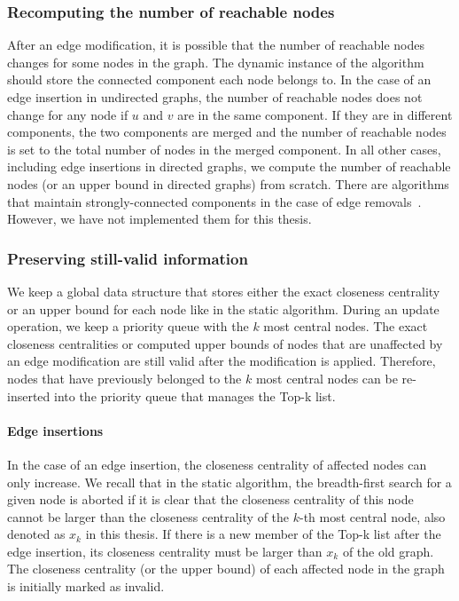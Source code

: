 \subsubsection{Recomputing the number of reachable nodes}
After an edge modification, it is possible that the number of reachable nodes changes for some nodes in the graph. The dynamic instance of the algorithm should store the connected component each node belongs to. In the case of an edge insertion in undirected graphs, the number of reachable nodes does not change for any node if $u$ and $v$ are in the same component. If they are in different components, the two components are merged and the number of reachable nodes is set to the total number of nodes in the merged component. In all other cases, including edge insertions in directed graphs, we compute the number of reachable nodes (or an upper bound in directed graphs) from scratch. There are algorithms that maintain strongly-connected components in the case of edge removals~\cite{lkacki2013improved,chechik2016decremental}. However, we have not implemented them for this thesis.

\subsubsection{Preserving still-valid information}
We keep a global data structure that stores either the exact closeness centrality or an upper bound for each node like in the static algorithm. During an update operation, we keep a priority queue with the $k$ most central nodes. The exact closeness centralities or computed upper bounds of nodes that are unaffected by an edge modification are still valid after the modification is applied. Therefore, nodes that have previously belonged to the $k$ most central nodes can be re-inserted into the priority queue that manages the Top-k list.

\paragraph{Edge insertions}
In the case of an edge insertion, the closeness centrality of affected nodes can only increase.  We recall that in the static algorithm, the breadth-first search for a given node is aborted if it is clear that the closeness centrality of this node cannot be larger than the closeness centrality of the $k$-th most central node, also denoted as $x_k$ in this thesis. If there is a new member of the Top-k list after the edge insertion, its closeness centrality must be larger than $x_k$ of the old graph. The closeness centrality (or the upper bound) of each affected node in the graph is initially marked as invalid. 

